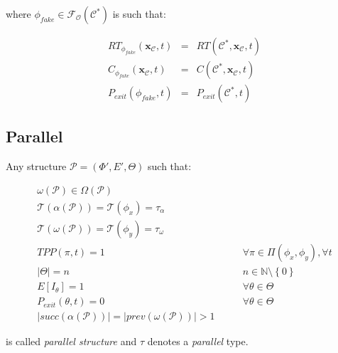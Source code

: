 \documentclass[12pt,a4paper]{report}
\newcommand{\N}{\mathbb{N}}
\begin{document}
where $\phi_{fake} \in \mathscr{F_O}(\mathcal{C}^*)$ is such that:

\begin{eqnarray}
	RT_{\phi_{fake}}(\textbf{x}_{\mathcal{C}}, t) & = & RT(\mathcal{C}^*,\textbf{x}_{\mathcal{C}}, t) \\
	C_{\phi_{fake}}(\textbf{x}_{\mathcal{C}}, t) & = & C(\mathcal{C}^*,\textbf{x}_{\mathcal{C}}, t) \\
	P_{exit}(\phi_{fake}, t) & = & P_{exit}(\mathcal{C}^*, t)
\end{eqnarray}

\subsection{Parallel}

Any structure $\mathcal{P} = (\Phi',E',\Theta)$ such that:

\begin{eqnarray}
	\omega(\mathcal{P}) \in \Omega(\mathcal{P}) \\
	\mathscr{T}(\alpha(\mathcal{P})) = \mathscr{T}(\phi_x) = \tau_{\alpha} \\ \mathscr{T}(\omega(\mathcal{P})) = \mathscr{T}(\phi_y) = \tau_{\omega} \\
	TPP(\pi, t) = 1 & \qquad \forall \pi \in \Pi(\phi_{x}, \phi_{y}), \forall t \\
	|\Theta| = n  & \qquad n \in \N \setminus \left\{0\right\} \\
	E[I_{\theta}] = 1 & \qquad \forall \theta \in \Theta \\
	P_{exit}(\theta, t) = 0 & \qquad \forall \theta \in \Theta \\
	|succ(\alpha(\mathcal{P}))| = |prev(\omega(\mathcal{P}))| > 1
\end{eqnarray}

is called \textit{parallel structure} and $\tau$ denotes a \textit{parallel} type.
\end{document}
